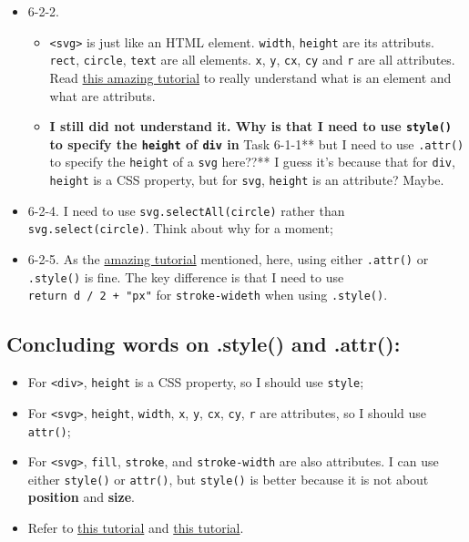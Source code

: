 \documentclass[
]{book}
\begin{document}
\begin{itemize}
\item
  6-2-2.

  \begin{itemize}
  \item
    \texttt{\textless{}svg\textgreater{}} is just like an HTML element. \texttt{width}, \texttt{height} are its attributs. \texttt{rect}, \texttt{circle}, \texttt{text} are all elements. \texttt{x}, \texttt{y}, \texttt{cx}, \texttt{cy} and \texttt{r} are all attributes. Read \href{http://jonathansoma.com/tutorials/d3/using-attr-and-style/}{this amazing tutorial} to really understand what is an element and what are attributs.
  \item
    \textbf{I still did not understand it. Why is that I need to use \texttt{style()} to specify the \texttt{height} of \texttt{div} in }Task 6-1-1** but I need to use \texttt{.attr()} to specify the \texttt{height} of a \texttt{svg} here??** I guess it's because that for \texttt{div}, \texttt{height} is a CSS property, but for \texttt{svg}, \texttt{height} is an attribute? Maybe.
  \end{itemize}
\item
  6-2-4. I need to use \texttt{svg.selectAll(\textquotesingle{}circle\textquotesingle{})} rather than \texttt{svg.select(\textquotesingle{}circle\textquotesingle{})}. Think about why for a moment;
\item
  6-2-5. As the \href{http://jonathansoma.com/tutorials/d3/using-attr-and-style/}{amazing tutorial} mentioned, here, using either \texttt{.attr()} or \texttt{.style()} is fine. The key difference is that I need to use \texttt{return\ d\ /\ 2\ +\ "px"} for \texttt{stroke-wideth} when using \texttt{.style()}.
\end{itemize}

\hypertarget{concluding-words-on-.style-and-.attr}{%
\subsection{Concluding words on .style() and .attr():}\label{concluding-words-on-.style-and-.attr}}

\begin{itemize}
\item
  For \texttt{\textless{}div\textgreater{}}, \texttt{height} is a CSS property, so I should use \texttt{style};
\item
  For \texttt{\textless{}svg\textgreater{}}, \texttt{height}, \texttt{width}, \texttt{x}, \texttt{y}, \texttt{cx}, \texttt{cy}, \texttt{r} are attributes, so I should use \texttt{attr()};
\item
  For \texttt{\textless{}svg\textgreater{}}, \texttt{fill}, \texttt{stroke}, and \texttt{stroke-width} are also attributes. I can use either \texttt{style()} or \texttt{attr()}, but \texttt{style()} is better because it is not about \textbf{position} and \textbf{size}.
\item
  Refer to \href{http://jonathansoma.com/tutorials/d3/using-attr-and-style/}{this tutorial} and \href{https://www.carlosrendon.me/unfinished_d3_book/d3_attr.html}{this tutorial}.
\end{itemize}
\end{document}
